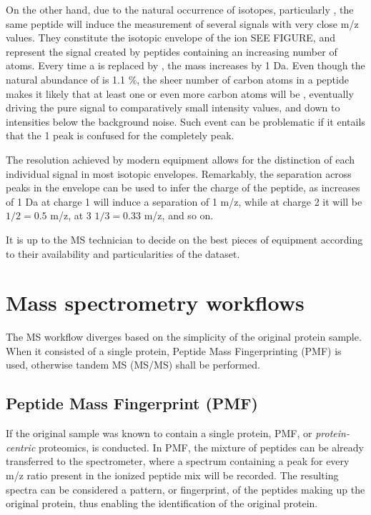 \documentclass[11pt, a4paper]{report}
\begin{document}
On the other hand, due to the natural occurrence of isotopes, particularly , the same peptide will induce the measurement of several signals with very close \ac{m/z} values. They constitute the isotopic envelope of the ion SEE FIGURE, and represent the signal created by peptides containing an increasing number of  atoms. Every time a  is replaced by , the mass increases by 1 Da. Even though the natural abundance of  is 1.1 \%, the sheer number of carbon atoms in a peptide makes it likely that at least one or even more carbon atoms will be , eventually driving the pure  signal to comparatively small intensity values, and down to intensities below the background noise. Such event can be problematic if it entails that the 1  peak is confused for the completely  peak.

The resolution achieved by modern equipment allows for the distinction of each individual signal in most isotopic envelopes. Remarkably, the separation across peaks in the envelope can be used to infer the charge of the peptide, as increases of 1 Da at charge 1 will induce a separation of 1 \ac{m/z}, while at charge 2 it will be $1/2 = 0.5$ \ac{m/z}, at 3 $1/3 = 0.33$ \ac{m/z}, and so on.

It is up to the \ac{MS} technician to decide on the best pieces of equipment according to their availability and particularities of the dataset.

\section{Mass spectrometry workflows}
\label{sec:mass_spectrometry_workflows}

The \ac{MS} workflow diverges based on the simplicity of the original protein sample. When it consisted of a single protein, Peptide Mass Fingerprinting (PMF) is used, otherwise tandem MS (MS/MS) shall be performed. 

\subsection{Peptide Mass Fingerprint (PMF)}
\label{subsec:pmf}

If the original sample was known to contain a single protein, PMF, or \textit{protein-centric} proteomics, is conducted. In PMF, the mixture of peptides can be already transferred to the spectrometer, where a spectrum containing a peak for every m/z ratio present in the ionized peptide mix will be recorded. The resulting spectra can be considered a pattern, or fingerprint, of the peptides making up the original protein, thus enabling the identification of the original protein.
\end{document}

